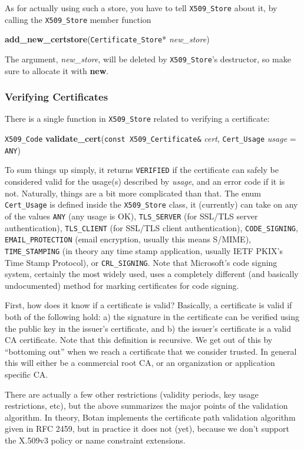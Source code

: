 \documentclass{article}
\newcommand{\function}[1]{\textbf{#1}}
\newcommand{\type}[1]{\texttt{#1}}
\renewcommand{\arg}[1]{\textsl{#1}}
\begin{document}
As for actually using such a store, you have to tell \type{X509\_Store} about
it, by calling the \type{X509\_Store} member function

\function{add\_new\_certstore}(\type{Certificate\_Store}* \arg{new\_store})

The argument, \arg{new\_store}, will be deleted by \type{X509\_Store}'s
destructor, so make sure to allocate it with \function{new}.

\subsubsection{Verifying Certificates}

There is a single function in \type{X509\_Store} related to verifying a
certificate:

\type{X509\_Code}
\function{validate\_cert}(\type{const X509\_Certificate\&} \arg{cert},
                          \type{Cert\_Usage} \arg{usage} = \type{ANY})

To sum things up simply, it returns \type{VERIFIED} if the certificate can
safely be considered valid for the usage(s) described by \arg{usage}, and an
error code if it is not. Naturally, things are a bit more complicated than
that. The enum \type{Cert\_Usage} is defined inside the \type{X509\_Store}
class, it (currently) can take on any of the values \type{ANY} (any usage is
OK), \type{TLS\_SERVER} (for SSL/TLS server authentication), \type{TLS\_CLIENT}
(for SSL/TLS client authentication), \type{CODE\_SIGNING},
\type{EMAIL\_PROTECTION} (email encryption, usually this means S/MIME),
\type{TIME\_STAMPING} (in theory any time stamp application, usually IETF
PKIX's Time Stamp Protocol), or \type{CRL\_SIGNING}. Note that Microsoft's code
signing system, certainly the most widely used, uses a completely different
(and basically undocumented) method for marking certificates for code signing.

First, how does it know if a certificate is valid? Basically, a certificate is
valid if both of the following hold: a) the signature in the certificate can be
verified using the public key in the issuer's certificate, and b) the issuer's
certificate is a valid CA certificate. Note that this definition is
recursive. We get out of this by ``bottoming out'' when we reach a certificate
that we consider trusted. In general this will either be a commercial root CA,
or an organization or application specific CA.

There are actually a few other restrictions (validity periods, key usage
restrictions, etc), but the above summarizes the major points of the validation
algorithm. In theory, Botan implements the certificate path validation
algorithm given in RFC 2459, but in practice it does not (yet), because we
don't support the X.509v3 policy or name constraint extensions.
\end{document}
